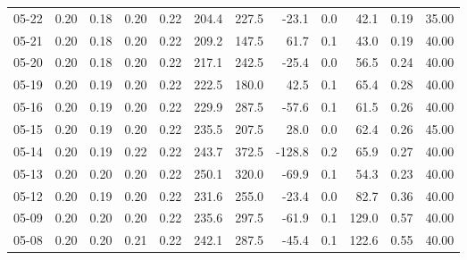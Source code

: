 \begin{threeparttable}
{\begin{tabular}{lrrrrrrrrrrr}
  05-22 &          0.20 &          0.18 &          0.20 &        0.22 &               204.4 &               227.5 &      -23.1 &                 0.0 &             42.1 &            0.19 &                  35.00 \\
  05-21 &          0.20 &          0.18 &          0.20 &        0.22 &               209.2 &               147.5 &       61.7 &                 0.1 &             43.0 &            0.19 &                  40.00 \\
  05-20 &          0.20 &          0.18 &          0.20 &        0.22 &               217.1 &               242.5 &      -25.4 &                 0.0 &             56.5 &            0.24 &                  40.00 \\
  05-19 &          0.20 &          0.19 &          0.20 &        0.22 &               222.5 &               180.0 &       42.5 &                 0.1 &             65.4 &            0.28 &                  40.00 \\
  05-16 &          0.20 &          0.19 &          0.20 &        0.22 &               229.9 &               287.5 &      -57.6 &                 0.1 &             61.5 &            0.26 &                  40.00 \\
  05-15 &          0.20 &          0.19 &          0.20 &        0.22 &               235.5 &               207.5 &       28.0 &                 0.0 &             62.4 &            0.26 &                  45.00 \\
  05-14 &          0.20 &          0.19 &          0.22 &        0.22 &               243.7 &               372.5 &     -128.8 &                 0.2 &             65.9 &            0.27 &                  40.00 \\
  05-13 &          0.20 &          0.20 &          0.20 &        0.22 &               250.1 &               320.0 &      -69.9 &                 0.1 &             54.3 &            0.23 &                  40.00 \\
  05-12 &          0.20 &          0.19 &          0.20 &        0.22 &               231.6 &               255.0 &      -23.4 &                 0.0 &             82.7 &            0.36 &                  40.00 \\
  05-09 &          0.20 &          0.20 &          0.20 &        0.22 &               235.6 &               297.5 &      -61.9 &                 0.1 &            129.0 &            0.57 &                  40.00 \\
  05-08 &          0.20 &          0.20 &          0.21 &        0.22 &               242.1 &               287.5 &      -45.4 &                 0.1 &            122.6 &            0.55 &                  40.00 \\

\end{tabular}}
\end{threeparttable}
